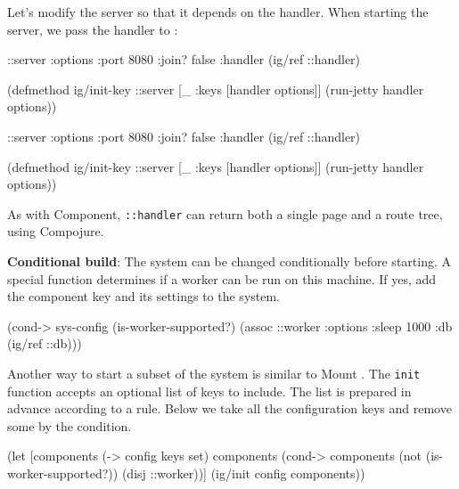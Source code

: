 \fi

Let's modify the server so that it depends on the handler. When starting the server, we pass the handler to :

\ifnarrow

\begin{english}
  \begin{clojure}
{::server {:options {:port 8080
                     :join? false}
           :handler (ig/ref ::handler)}}

(defmethod ig/init-key ::server
  [_ {:keys [handler options]}]
  (run-jetty handler options))
  \end{clojure}
\end{english}

\else

\begin{english}
  \begin{clojure}
{::server {:options {:port 8080 :join? false}
           :handler (ig/ref ::handler)}}

(defmethod ig/init-key ::server
  [_ {:keys [handler options]}]
  (run-jetty handler options))
  \end{clojure}
\end{english}

\fi

As with Component, \verb|::handler| can return both a single page and a route tree, using Compojure.


\textbf{Conditional build}: The system can be changed conditionally before starting. A special function determines if a worker can be run on this machine. If yes, add the component key and its settings to the system.

\begin{english}
  \begin{clojure}
(cond-> sys-config
  (is-worker-supported?)
  (assoc ::worker {:options {:sleep 1000}
                   :db (ig/ref ::db)}))
  \end{clojure}
\end{english}

Another way to start a subset of the system is similar to Mount . The \verb|init| function accepts an optional list of keys to include. The list is prepared in advance according to a rule. Below we take all the configuration keys and remove some by the condition.

\ifnarrow

\begin{english}
  \begin{clojure}
(let [components (-> config keys set)
      components
      (cond-> components
        (not (is-worker-supported?))
        (disj ::worker))]
  (ig/init config components))
  \end{clojure}
\end{english}

